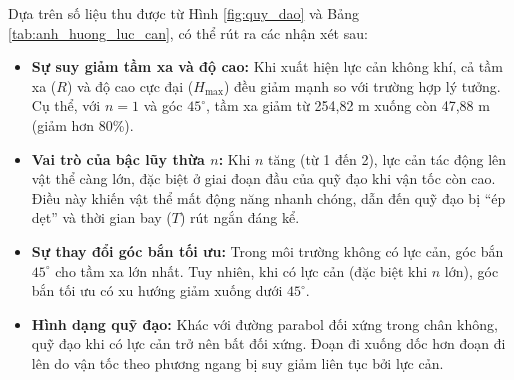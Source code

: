 Dựa trên số liệu thu được từ Hình \ref{fig:quy_dao} và Bảng \ref{tab:anh_huong_luc_can}, có thể rút ra các nhận xét sau:

\begin{itemize}
\item \textbf{Sự suy giảm tầm xa và độ cao:} Khi xuất hiện lực cản không khí, cả tầm xa ($R$) và độ cao cực đại ($H_{\max}$) đều giảm mạnh so với trường hợp lý tưởng. Cụ thể, với $n=1$ và góc $45^\circ$, tầm xa giảm từ 254,82 m xuống còn 47,88 m (giảm hơn 80\%).
    
\item \textbf{Vai trò của bậc lũy thừa $n$:} Khi $n$ tăng (từ 1 đến 2), lực cản tác động lên vật thể càng lớn, đặc biệt ở giai đoạn đầu của quỹ đạo khi vận tốc còn cao. Điều này khiến vật thể mất động năng nhanh chóng, dẫn đến quỹ đạo bị “ép dẹt” và thời gian bay ($T$) rút ngắn đáng kể.
    
\item \textbf{Sự thay đổi góc bắn tối ưu:} Trong môi trường không có lực cản, góc bắn $45^\circ$ cho tầm xa lớn nhất. Tuy nhiên, khi có lực cản (đặc biệt khi $n$ lớn), góc bắn tối ưu có xu hướng giảm xuống dưới $45^\circ$.
    
\item \textbf{Hình dạng quỹ đạo:} Khác với đường parabol đối xứng trong chân không, quỹ đạo khi có lực cản trở nên bất đối xứng. Đoạn đi xuống dốc hơn đoạn đi lên do vận tốc theo phương ngang bị suy giảm liên tục bởi lực cản.
\end{itemize}
